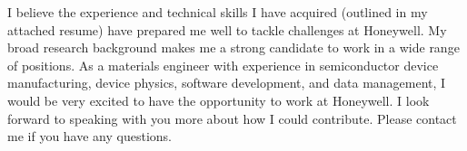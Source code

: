 \documentclass[11pt,a4paper,roman]{moderncv}        %
\begin{document}

I believe the experience and technical skills I have acquired (outlined in my attached resume) have prepared me well to tackle challenges at Honeywell.  
My broad research background makes me a strong candidate to work in a wide range of positions.
As a materials engineer with experience in semiconductor device manufacturing, device physics, software development, and data management, I would be very excited to have the opportunity to work at Honeywell.  
I look forward to speaking with you more about how I could contribute.  
Please contact me if you have any questions.



\makeletterclosing
\end{document}
